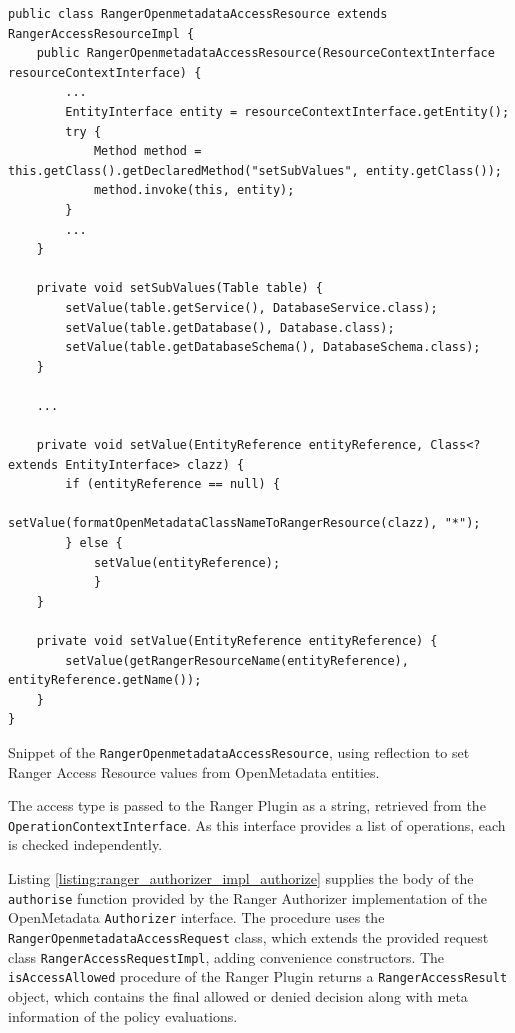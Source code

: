\begin{listing}

\begin{verbatim}
public class RangerOpenmetadataAccessResource extends RangerAccessResourceImpl {
    public RangerOpenmetadataAccessResource(ResourceContextInterface resourceContextInterface) {
        ...
        EntityInterface entity = resourceContextInterface.getEntity();
        try {
            Method method = this.getClass().getDeclaredMethod("setSubValues", entity.getClass());
            method.invoke(this, entity);
        } 
        ...
    }
    
    private void setSubValues(Table table) {
        setValue(table.getService(), DatabaseService.class);
        setValue(table.getDatabase(), Database.class);
        setValue(table.getDatabaseSchema(), DatabaseSchema.class);
    }
    
    ...

    private void setValue(EntityReference entityReference, Class<? extends EntityInterface> clazz) {
        if (entityReference == null) {
            setValue(formatOpenMetadataClassNameToRangerResource(clazz), "*");
        } else {
            setValue(entityReference);
            }
    }

    private void setValue(EntityReference entityReference) {
        setValue(getRangerResourceName(entityReference), entityReference.getName());
    }
}
\end{verbatim}

\caption{Snippet of the \texttt{RangerOpenmetadataAccessResource}, using reflection to set Ranger Access Resource values from OpenMetadata entities.}

\label{listing:ranger_openmetadta_access_resource}

\end{listing}

The access type is passed to the Ranger Plugin as a string, retrieved from the \texttt{OperationContextInterface}. As this interface provides a list of operations, each is checked independently.

Listing \ref{listing:ranger_authorizer_impl_authorize} supplies the body of the \texttt{authorise} function provided by the Ranger Authorizer implementation of the OpenMetadata \texttt{Authorizer} interface. The procedure uses the \texttt{RangerOpenmetadataAccessRequest} class, which extends the provided request class \texttt{RangerAccessRequestImpl}, adding convenience constructors. The \texttt{isAccessAllowed} procedure of the Ranger Plugin returns a \texttt{RangerAccessResult} object, which contains the final allowed or denied decision along with meta information of the policy evaluations.


